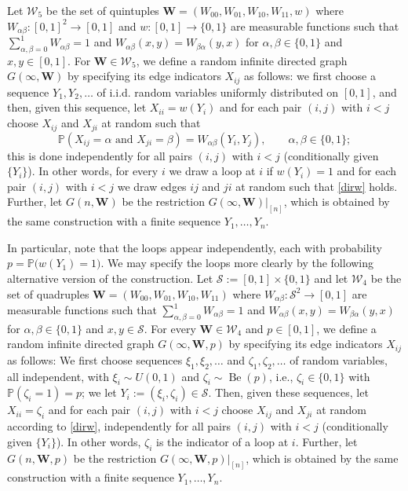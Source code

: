 \documentclass[11pt,reqno,tbtags]{amsart}
\numberwithin{equation}{section}
\theoremstyle{definition}
\theoremstyle{remark}
\newcommand\set[1]{\ensuremath{\{#1\}}}
\newcommand\bigpar[1]{\bigl(#1\bigr)}
\newcommand\iid{i.i.d.\spacefactor=1000}
\newcommand\ie{i.e.\spacefactor=1000}
\newcounter{cc}
\renewcommand\P{\operatorname{\mathbb P{}}}
\newcommand\Be{\operatorname{Be}}
\newcommand\ga{\alpha}
\newcommand\gb{\beta}
\newcommand\cS{{\mathcal S}}
\newcommand\cW{\mathcal W}
\renewcommand{\=}{:=}
\newcommand\oi{[0,1]}
\newcommand{\rest}[1]{|_{[#1]}}
\newcommand{\gbwx}[1]{G(#1,\bW)}
\newcommand{\gbwoo}{\gbwx\infty}
\newcommand{\gbwn}{\gbwx{n}}
\newcommand{\gbwpx}[1]{G(#1,\bW,p)}
\newcommand{\gbwpoo}{\gbwpx\infty}
\newcommand{\gbwpn}{\gbwpx{n}}
\newcommand{\uoi}{U(0,1)}
\newcommand{\wab}{W_{\ga\gb}}
\newcommand{\wo}{w}%
\newcommand{\bW}{\mathbf{W}}
\newcommand{\setoi}{\set{0,1}}
\newcommand{\xx}{Y}
\newcommand{\csp}{\cS}
\newcommand{\WW}{\cW_5}
\newcommand{\WWW}{\cW_4}
\begin{document}
Let $\WW$ be the set of quintuples
$\bW=(W_{00},W_{01},W_{10},W_{11},\wo)$ where  
$\wab:\oi^2\to\oi$ and $\wo:\oi\to\setoi$ are measurable functions 
such that $\sum_{\ga,\gb=0}^1\wab=1$ and $\wab(x,y)=W_{\gb\ga}(y,x)$
for $\ga,\gb\in\setoi$ and $x,y\in\oi$.
For $\bW\in\WW$, we define a random infinite directed graph
$\gbwoo$
by specifying its edge indicators $X_{ij}$
as follows: we
first choose a sequence $\xx_1,\xx_2,\dots$ of \iid{} random variables
uniformly distributed on $\oi$, and then, given this sequence,
let $X_{ii}=\wo(\xx_i)$ and 
for each pair $(i,j)$ with $i<j$ choose $X_{ij}$ and $X_{ji}$ at random
such that
\begin{equation}\label{dirw}
 \P(X_{ij}=\ga \text{ and } X_{ji}=\gb)=\wab(\xx_i,\xx_j),
\qquad \ga,\gb\in\setoi;
\end{equation}
this is done independently for
all pairs $(i,j)$ with $i<j$ (conditionally given \set{\xx_i}).
In other words, for every $i$ we draw a loop at $i$ if $\wo(\xx_i)=1$ 
and
for each pair $(i,j)$ with $i<j$ we 
draw edges $ij$ and $ji$ at random such that \eqref{dirw} holds.
%
Further, let $\gbwn$ be the restriction $\gbwoo\rest n$, which is
obtained by the same construction with a finite sequence $\xx_1,\dots,\xx_n$.

In particular, note that the loops appear independently, each with
probability $p=\P\bigpar{w(\xx_1)=1}$. We may specify the loops more clearly 
by the following alternative version of the construction.
Let $\csp\=\oi\times\setoi$ and
let $\WWW$ be the set of quadruples
$\bW=(W_{00},W_{01},W_{10},W_{11})$ where 
$\wab:\csp^2\to\oi$  are measurable functions 
such that $\sum_{\ga,\gb=0}^1\wab=1$ and $\wab(x,y)=W_{\gb\ga}(y,x)$
for $\ga,\gb\in\setoi$ and $x,y\in\csp$.
For every $\bW\in\WWW$ and $p\in\oi$, we define a
random infinite directed graph 
$\gbwpoo$
by specifying its edge indicators $X_{ij}$
as follows: We
first choose 
sequences $\xi_1,\xi_2,\dots$ and $\zeta_1,\zeta_2,\dots$ of random
variables, all independent, with $\xi_i\sim\uoi$ and
$\zeta_i\sim\Be(p)$, \ie, $\zeta_i\in\setoi$ with $\P(\zeta_i=1)=p$;
we let $Y_i\=(\xi_i,\zeta_i)\in\csp$.
Then, given these sequences,
let $X_{ii}=\zeta_i$ and 
for each pair $(i,j)$ with $i<j$ choose $X_{ij}$ and $X_{ji}$ at random
according to \eqref{dirw},
independently for
all pairs $(i,j)$ with $i<j$ (conditionally given \set{\xx_i}).
In other words, $\zeta_i$ is the indicator of a loop at $i$.
%
Further, let $\gbwpn$ be the restriction $\gbwpoo\rest n$, which is
obtained by the same construction with a finite sequence $\xx_1,\dots,\xx_n$.
\end{document}
